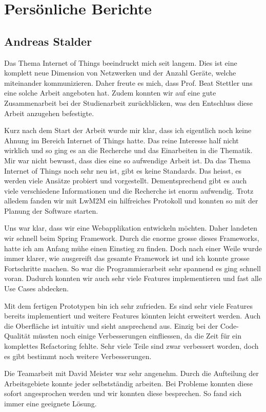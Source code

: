 \chapter{Persönliche Berichte}

\section{Andreas Stalder}
Das Thema Internet of Things beeindruckt mich seit langem. Dies ist eine komplett neue Dimension von Netzwerken und der Anzahl Geräte, welche miteinander kommunizieren. Daher freute es mich, dass Prof. Beat Stettler uns eine solche Arbeit angeboten hat. Zudem konnten wir auf eine gute Zusammenarbeit bei der Studienarbeit zurückblicken, was den Entschluss diese Arbeit anzugehen befestigte.

Kurz nach dem Start der Arbeit wurde mir klar, dass ich eigentlich noch keine Ahnung im Bereich Internet of Things hatte. Das reine Interesse half nicht wirklich und so ging es an die Recherche und das Einarbeiten in die Thematik. Mir war nicht bewusst, dass dies eine so aufwendige Arbeit ist. Da das Thema Internet of Things noch sehr neu ist, gibt es keine Standards. Das heisst, es werden viele Ansätze probiert und vorgestellt. Dementsprechend gibt es auch viele verschiedene Informationen und die Recherche ist enorm aufwendig. Trotz alledem fanden wir mit LwM2M ein hilfreiches Protokoll und konnten so mit der Planung der Software starten.

Uns war klar, dass wir eine Webapplikation entwickeln möchten. Daher landeten wir schnell beim Spring Framework. Durch die enorme grosse dieses Frameworks, hatte ich am Anfang mühe einen Einstieg zu finden. Doch nach einer Weile wurde immer klarer, wie ausgereift das gesamte Framework ist und ich konnte grosse Fortschritte machen. So war die Programmierarbeit sehr spannend es ging schnell voran. Dadurch konnten wir auch sehr viele Features implementieren und fast alle Use Cases abdecken.

Mit dem fertigen Prototypen bin ich sehr zufrieden. Es sind sehr viele Features bereits implementiert und weitere Features könnten leicht erweitert werden. Auch die Oberfläche ist intuitiv und sieht ansprechend aus. Einzig bei der Code-Qualität müssten noch einige Verbesserungen einfliessen, da die Zeit für ein komplettes Refactoring fehlte. Sehr viele Teile sind zwar verbessert worden, doch es gibt bestimmt noch weitere Verbesserungen.

Die Teamarbeit mit David Meister war sehr angenehm. Durch die Aufteilung der Arbeitsgebiete konnte jeder selbstständig arbeiten. Bei Probleme konnten diese sofort angesprochen werden und wir konnten diese besprechen. So fand sich immer eine geeignete Lösung.

